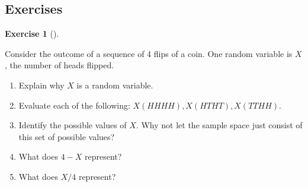 \documentclass[
  letterpaper,
  DIV=11,
  numbers=noendperiod]{scrreprt}
\providecommand{\tightlist}{%
  \setlength{\itemsep}{0pt}\setlength{\parskip}{0pt}}
\theoremstyle{plain}
\theoremstyle{definition}
\theoremstyle{definition}
\newtheorem{exercise}{Exercise}[chapter]
\theoremstyle{definition}
\theoremstyle{remark}
\begin{document}
\subsection{Exercises}\label{exercises-11}

\begin{exercise}[]\protect\hypertarget{exr-rv-coin4}{}\label{exr-rv-coin4}

Consider the outcome of a sequence of 4 flips of a coin. One random
variable is \(X\), the number of heads flipped.

\begin{enumerate}
\def\labelenumi{\arabic{enumi}.}
\tightlist
\item
  Explain why \(X\) is a random variable.
\item
  Evaluate each of the following: \(X(HHHH), X(HTHT), X(TTHH)\).
\item
  Identify the possible values of \(X\). Why not let the sample space
  just consist of this set of possible values?
\item
  What does \(4-X\) represent?
\item
  What does \(X/4\) represent?
\end{enumerate}

\end{exercise}
\end{document}
